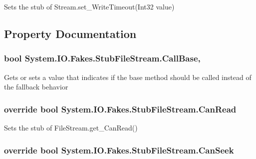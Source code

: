Sets the stub of Stream.\-set\-\_\-\-Write\-Timeout(\-Int32 value)



\subsection{Property Documentation}
\hypertarget{class_system_1_1_i_o_1_1_fakes_1_1_stub_file_stream_a9632382329d8c1d2e71baaeb74d58842}{
\subsubsection[{Call\-Base}]{\setlength{\rightskip}{0pt plus 5cm}bool System.\-I\-O.\-Fakes.\-Stub\-File\-Stream.\-Call\-Base\hspace{0.3cm}{\ttfamily [get]}, {\ttfamily [set]}}}\label{class_system_1_1_i_o_1_1_fakes_1_1_stub_file_stream_a9632382329d8c1d2e71baaeb74d58842}


Gets or sets a value that indicates if the base method should be called instead of the fallback behavior

\hypertarget{class_system_1_1_i_o_1_1_fakes_1_1_stub_file_stream_a83f88fad7d526fa0ec57cf592095344e}{
\subsubsection[{Can\-Read}]{\setlength{\rightskip}{0pt plus 5cm}override bool System.\-I\-O.\-Fakes.\-Stub\-File\-Stream.\-Can\-Read\hspace{0.3cm}{\ttfamily [get]}}}\label{class_system_1_1_i_o_1_1_fakes_1_1_stub_file_stream_a83f88fad7d526fa0ec57cf592095344e}


Sets the stub of File\-Stream.\-get\-\_\-\-Can\-Read()

\hypertarget{class_system_1_1_i_o_1_1_fakes_1_1_stub_file_stream_a443966b8b7fbeeb75c9545e5962aaf7a}{
\subsubsection[{Can\-Seek}]{\setlength{\rightskip}{0pt plus 5cm}override bool System.\-I\-O.\-Fakes.\-Stub\-File\-Stream.\-Can\-Seek\hspace{0.3cm}{\ttfamily [get]}}}\label{class_system_1_1_i_o_1_1_fakes_1_1_stub_file_stream_a443966b8b7fbeeb75c9545e5962aaf7a}


